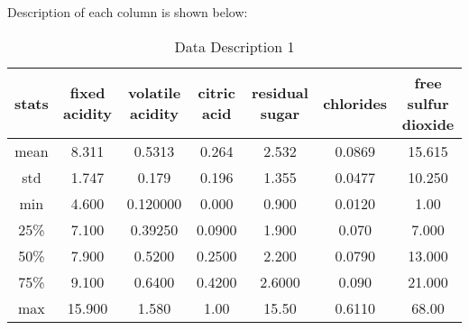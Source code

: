 Description of each column is shown below:

\begin{table}[H]
    \begin{center}
        \begin{tabular}{ |c|c|c|c|c|c|c| }
            \hline
            stats      & 
            fixed acidity&	volatile acidity	&citric acid&	residual sugar&	chlorides	&free sulfur dioxide  \\
            \hline
            mean & 8.311	& 0.5313	& 0.264 &	2.532 &	0.0869	& 15.615 \\
            \hline

            std & 1.747	&0.179&	0.196&	1.355	&0.0477&	10.250 \\
            \hline

            min & 4.600&	0.120000	&0.000&	0.900	&0.0120&	1.00 \\
            \hline

            25\% & 7.100	&0.39250 & 0.0900 &	1.900	&0.070&	7.000 \\
            \hline

            50\% & 7.900 &	0.5200&0.2500	&2.200&	0.0790&13.000	 \\
            \hline

            75\% & 9.100	&0.6400&0.4200&2.6000&0.090	&21.000	 \\
            \hline

            max & 15.900 &	1.580	&1.00&	15.50&	0.6110	&68.00 \\
            \hline
        \end{tabular}
    \end{center}
    \caption{Data Description 1}
    \label{table:Data Description 1}
\end{table}


